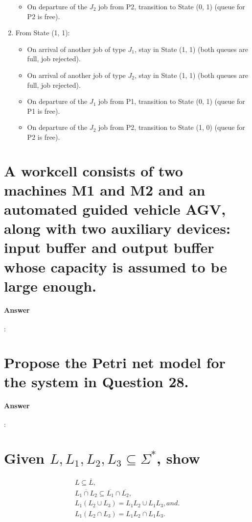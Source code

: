 \documentclass{article}
\begin{document}
\begin{enumerate}
\begin{itemize}
    \item On departure of the $J_2$ job from P2, transition to State (0, 1) (queue for P2 is free).
  \end{itemize}
  \item From State (1, 1):
  \begin{itemize}
    \item On arrival of another job of type $J_1$, stay in State (1, 1) (both queues are full, job rejected).
    \item On arrival of another job of type $J_2$, stay in State (1, 1) (both queues are full, job rejected).
    \item On departure of the $J_1$ job from P1, transition to State (0, 1) (queue for P1 is free).
    \item On departure of the $J_2$ job from P2, transition to State (1, 0) (queue for P2 is free).
  \end{itemize}
  
\end{enumerate}


\section{A workcell consists of two machines M1 and M2 and an automated guided vehicle AGV, along with two auxiliary devices: input buffer and output buffer whose capacity is assumed to be large enough.}

\paragraph{Answer}:


\section{Propose the Petri net model for the system in Question 28.}

\paragraph{Answer}:


\section{Given $L, L_1, L_2, L_3 \subseteq  \Sigma^*$, show}

\begin{gather*}
  L \subseteq \overline{L}, \\
  \overline{ L_1 \cap L_2 } \subseteq \overline{L_1} \cap \overline{L_2}, \\
  L_1(L_2 \cup L_3) = L_1L_2 \cup L_1L_3, and. \\
  L_1(L_2 \cap L_3) = L_1L_2 \cap L_1L_3.
\end{gather*}
\end{document}
